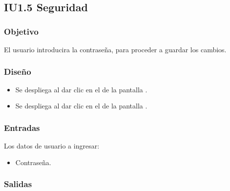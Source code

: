 \newpage
\subsection{IU1.5 Seguridad}

\subsubsection{Objetivo}
	El usuario introducira la contraseña, para proceder a guardar los cambios.

\subsubsection{Diseño}
	\begin{itemize}
		\item Se despliega al dar clic en el  de la pantalla .
		\item Se despliega al dar clic en el  de la pantalla .
\end{itemize}		


\subsubsection{Entradas}
Los datos de usuario a ingresar:
\begin{itemize}
	\item Contraseña.
\end{itemize}

\subsubsection{Salidas}
\begin{Citemize}
	\item {}
	\item {}
	\item {}
\end{Citemize}
